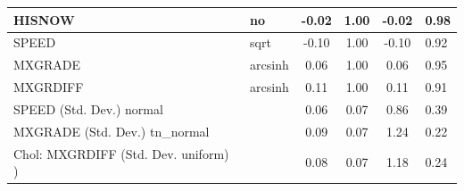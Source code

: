 \begin{table}
\begin{center}
\begin{tabular}{|l|l|c|c|c|l|}
			\hline
			HISNOW & no & -0.02 & 1.00 & -0.02 & 0.98 \\
			\hline
			SPEED & sqrt & -0.10 & 1.00 & -0.10 & 0.92 \\
			\hline
			MXGRADE & arcsinh & 0.06 & 1.00 & 0.06 & 0.95 \\
			\hline
			MXGRDIFF & arcsinh & 0.11 & 1.00 & 0.11 & 0.91 \\
			\hline
			SPEED (Std. Dev.) normal &  & 0.06 & 0.07 & 0.86 & 0.39 \\
			\hline
			MXGRADE (Std. Dev.) tn_normal &  & 0.09 & 0.07 & 1.24 & 0.22 \\
			\hline
			 Chol: MXGRDIFF (Std. Dev. uniform) ) &  & 0.08 & 0.07 & 1.18 & 0.24 \\
			\hline
		\end{tabular}
	\end{center}
\end{table}